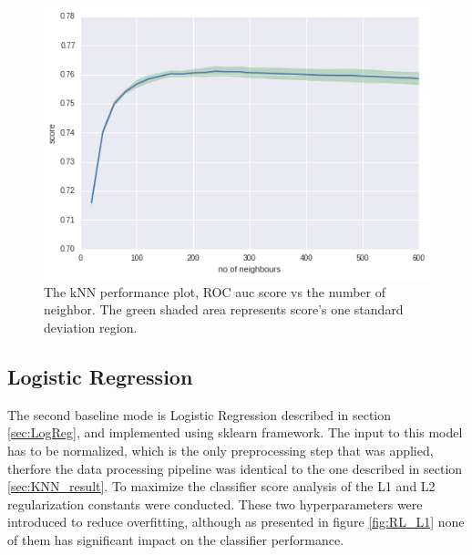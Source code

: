 \begin{figure}[!h]
\centering
\hspace*{-1cm}\includegraphics{figures/knn.png}
\caption{The kNN performance plot, ROC auc score vs the number of neighbor. The green shaded area represents score's one standard deviation region.}
\label{fig:kNN score}
\end{figure}

\subsection{Logistic Regression}

The second baseline mode is Logistic Regression described in section \ref{sec:LogReg}, and implemented using sklearn framework.
The input to this model has to be normalized, which is the only preprocessing step that was applied, therfore the data processing pipeline was identical to the one described in section \ref{sec:KNN_result}. 
To maximize the classifier score analysis of the L1 and L2 regularization constants were conducted. These two hyperparameters were introduced to reduce overfitting, although as presented in figure \ref{fig:RL_L1} none of them has significant impact on the classifier performance.


